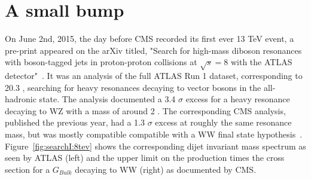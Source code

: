 \section{A small bump}
On June 2nd, 2015, the day before CMS recorded its first ever 13 TeV event, a pre-print appeared on the arXiv titled, "Search for high-mass diboson resonances with boson-tagged jets in proton-proton collisions at $\sqrt{s} = 8$ \TeV with the ATLAS detector"~\cite{Aad2015}.
It was an analysis of the full ATLAS Run 1 dataset, corresponding to 20.3 \fbinv, searching for heavy resonances decaying to vector bosons in the all-hadronic state. The analysis documented a 3.4 $\sigma$ excess for a heavy resonance decaying to WZ with a mass of around 2 \TeV.
The corresponding CMS analysis, published the previous year, had a 1.3 $\sigma$ excess at roughly the same resonance mass, but was mostly compatible compatible with a WW final state hypothesis~\cite{Khachatryan:1700394}. Figure~\ref{fig:searchI:8tev} shows the corresponding dijet invariant mass spectrum as seen by ATLAS (left) and the upper limit on the production times the cross section for a $G_{Bulk}$ decaying to WW (right) as documented by CMS.

